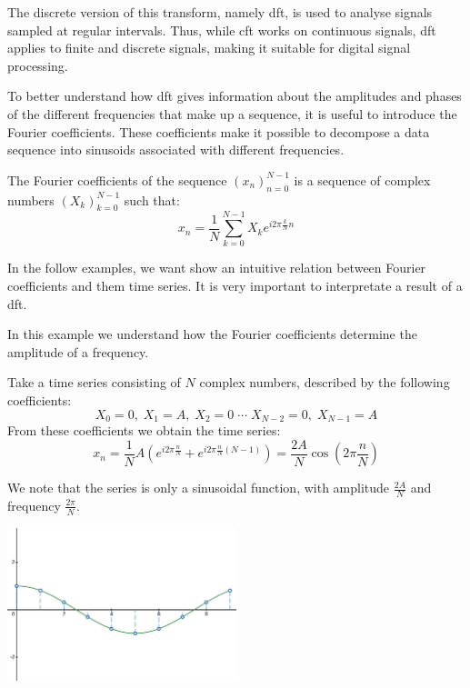 \bigskip
The discrete version of this transform, namely \gls{dft}, is used to analyse signals sampled at regular intervals. Thus, while \gls{cft} works on continuous signals, \gls{dft} applies to finite and discrete signals, making it suitable for digital signal processing.

\noindent To better understand how \gls{dft} gives information about the amplitudes and phases of the different frequencies that make up a sequence, it is useful to introduce the Fourier coefficients. These coefficients make it possible to decompose a data sequence into sinusoids associated with different frequencies.

\begin{modified}
\begin{remark}
	The Fourier coefficients of the sequence $(x_n)_{n=0}^{N-1}$ is a sequence of complex numbers $(X_k)_{k=0}^{N-1}$ such that:
	\begin{equation}
		x_n = \frac{1}{N}\sum_{k=0}^{N-1} X_k e^{i2\pi\frac{k}{N}n}
	\end{equation}

	\noindent In the follow examples, we want show an intuitive relation between Fourier coefficients and them time series. It is very important to interpretate a result of a \gls{dft}.
\end{remark}
\end{modified}

\begin{exempli_gratia}[Amplitude]
	\begin{toReview}
		In this example we understand how the Fourier coefficients determine the amplitude of a frequency.
	\end{toReview}

	\noindent Take a time series consisting of $N$ complex numbers, described by the following coefficients:
	\[
		X_0=0,\;X_1=A,\;X_2=0\;\cdots\;X_{N-2}=0,\;X_{N-1}=A
	\]
	From these coefficients we obtain the time series:
	\[
		x_n = \frac{1}{N}A\left(e^{i2\pi \frac{n}{N}} + e^{i2\pi \frac{n}{N}(N-1)}\right) = \frac{2A}{N}\cos\left(2\pi\frac{n}{N}\right)
	\]
	\begin{modified}
	We note that the series is only a sinusoidal function, with amplitude $\frac{2A}{N}$ and frequency $\frac{2\pi}{N}$.
	\begin{center}
		\centering
		\includegraphics[width=0.5\textwidth]{Figures/fftexample1.png}
	\end{center}
	\end{modified}
\end{exempli_gratia}

